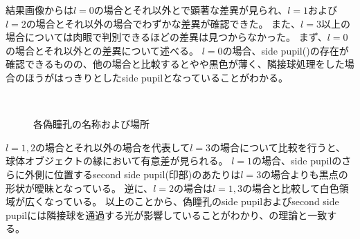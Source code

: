 \newpage
結果画像からは$l = 0$の場合とそれ以外とで顕著な差異が見られ、$l = 1$および$l = 2$の場合とそれ以外の場合でわずかな差異が確認できた。
また、$l = 3$以上の場合については肉眼で判別できるほどの差異は見つからなかった。
まず、$l = 0$の場合とそれ以外との差異について述べる。
$l = 0$の場合、side pupil()の存在が確認できるものの、他の場合と比較するとやや黒色が薄く、隣接球処理をした場合のほうがはっきりとしたside pupilとなっていることがわかる。
\begin{figure}[htbp]
  \centering
{}\\
  \caption{各偽瞳孔の名称および場所}
  \label{FPseudopupilName}
\end{figure}
$l = 1,2$の場合とそれ以外の場合を代表して$l = 3$の場合について比較を行うと、球体オブジェクトの縁において有意差が見られる。
$l = 1$の場合、side pupilのさらに外側に位置するsecond side pupil(\figref{}印部)のあたりは$l = 3$の場合よりも黒点の形状が曖昧となっている。
逆に、$l = 2$の場合は$l = 1,3$の場合と比較して白色領域が広くなっている。
以上のことから、偽瞳孔のside pupilおよびsecond side pupilには隣接球を通過する光が影響していることがわかり、の理論と一致する。

